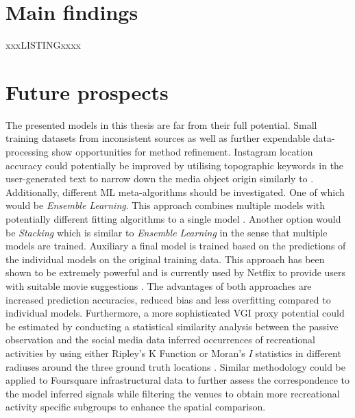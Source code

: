 \section{Main findings}

xxxLISTINGxxxx

\section{Future prospects} \label{future_prospects}
The presented models in this thesis are far from their full potential. Small training datasets from inconsistent sources as well as further expendable data-processing show opportunities for method refinement. Instagram location accuracy could potentially be improved by utilising topographic keywords in the user-generated text to narrow down the media object origin similarly to \parencite{Ostermann2015}. \\
Additionally, different ML meta-algorithms should be investigated. One of which would be \textit{Ensemble Learning}. This approach combines multiple models with potentially different fitting algorithms to a single model \parencite{Zhou2009}. Another option would be \textit{Stacking} which is similar to \textit{Ensemble Learning} in the sense that multiple models are trained. Auxiliary a final model is trained based on the predictions of the individual models on the original training data. This approach has been shown to be extremely powerful and is currently used by Netflix to provide users with suitable movie suggestions \parencite{AndreasToscher2009}. The advantages of both approaches are increased prediction accuracies, reduced bias and less overfitting compared to individual models. Furthermore, a more sophisticated VGI proxy potential could be estimated by conducting a statistical similarity analysis between the passive observation and the social media data inferred occurrences of recreational activities by using either Ripley's K Function or Moran's \textit{I} statistics in different radiuses around the three ground truth locations \parencite{OSullivan2003}. Similar methodology could be applied to Foursquare infrastructural data to further assess the correspondence to the model inferred signals while filtering the venues to obtain more recreational activity specific subgroups to enhance the spatial comparison. 



